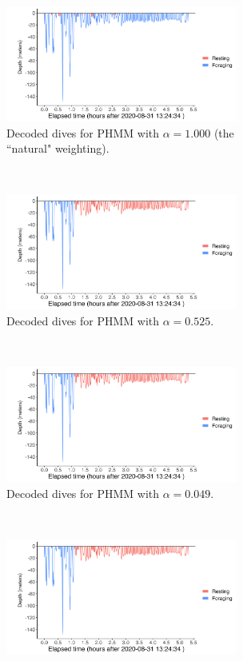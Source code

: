 \begin{figure}[H]
    \centering
    \begin{subfigure}[t]{0.45\textwidth}
        \centering
        \includegraphics[width = 3in]{plt/D26b-profile-D26b-fixed-1.png}
        \caption{Decoded dives for PHMM with $\alpha = 1.000$ (the ``natural" weighting).}
    \end{subfigure}
    ~ 
    \begin{subfigure}[t]{0.45\textwidth}
        \centering
        \includegraphics[width = 3in]{plt/D26b-profile-D26b-fixed-0.5245.png}
        \caption{Decoded dives for PHMM with $\alpha = 0.525$.}
    \end{subfigure}
    \\
    \begin{subfigure}[t]{0.45\textwidth}
        \centering
        \includegraphics[width = 3in]{plt/D26b-profile-D26b-fixed-0.049.png}
        \caption{Decoded dives for PHMM with $\alpha = 0.049$.}
    \end{subfigure}
    ~
    \begin{subfigure}[t]{0.45\textwidth}
        \centering
        \includegraphics[width = 3in]{plt/D26b-profile-D26b-fixed-0.0245.png}

\end{subfigure}
\end{figure}
